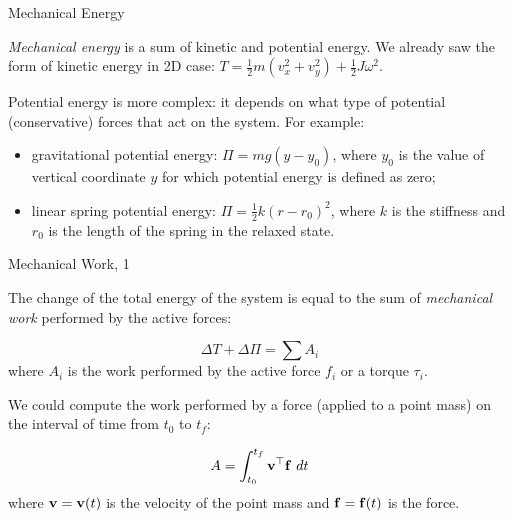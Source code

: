 \documentclass{beamer}
\begin{document}
\begin{frame}{Mechanical Energy}
	\begin{flushleft}
		
		\emph{Mechanical energy} is a sum of kinetic and potential energy. We already saw the form of kinetic energy in 2D case: $T = \frac{1}{2} m (v_x^2 + v_y^2) + \frac{1}{2} J \omega^2$. 
		
		\bigskip
		
		Potential energy is more complex: it depends on what type of potential (conservative) forces that act on the system. For example:
		
		\begin{itemize}
			\item gravitational potential energy: $\Pi = mg (y - y_0)$, where $y_0$ is the value of vertical coordinate $y$ for which potential energy is defined as zero;
			
			\item linear spring potential energy: $\Pi = \frac{1}{2} k (r - r_0)^2$, where $k$ is the stiffness and $r_0$ is the length of the spring in the relaxed state.
		\end{itemize}
		
	\end{flushleft}
\end{frame}


\begin{frame}{Mechanical Work, 1}
	\begin{flushleft}
		
		The change of the total energy of the system is equal to the sum of \emph{mechanical work} performed by the active forces:
		
		\begin{equation}
			\Delta T + \Delta \Pi = \sum A_i
		\end{equation}				
		where $A_i$ is the work performed by the active force $f_i$ or a torque $\tau_i$.
		
		\bigskip
		
		We could compute the work performed by a force (applied to a point mass) on the interval of time from $t_0$ to $t_f$:
		
		\begin{equation}
			A = \int_{t_0}^{t_f} \mathbf{v}^\top \mathbf{f} \  dt
		\end{equation}
		where $\mathbf{v} = \mathbf{v}(t)$	is the velocity of the point mass and $\mathbf{f} = \mathbf{f}(t)$ is the force.
		
	\end{flushleft}
\end{frame}
\end{document}
